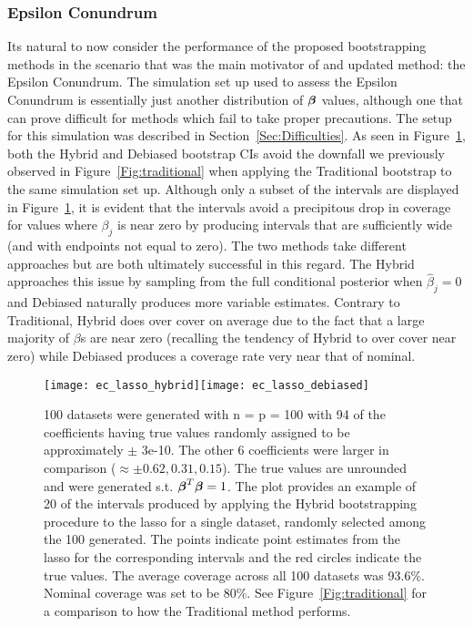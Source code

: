 \subsubsection{Epsilon Conundrum}\label{Sec:Epsilon}


Its natural to now consider the performance of the proposed bootstrapping methods in the scenario that was the main motivator of and updated method: the Epsilon Conundrum. The simulation set up used to assess the Epsilon Conundrum is essentially just another distribution of $\boldsymbol{\beta}$ values, although one that can prove difficult for methods which fail to take proper precautions. The setup for this simulation was described in Section~\ref{Sec:Difficulties}. As seen in Figure~\ref{Fig:zerosample2}, both the Hybrid and Debiased bootstrap CIs avoid the downfall we previously observed in Figure~\ref{Fig:traditional} when applying the Traditional bootstrap to the same simulation set up. Although only a subset of the intervals are displayed in Figure~\ref{Fig:zerosample2}, it is evident that the intervals avoid a precipitous drop in coverage for values where $\beta_j$ is near zero by producing intervals that are sufficiently wide (and with endpoints not equal to zero). The two methods take different approaches but are both ultimately successful in this regard. The Hybrid approaches this issue by sampling from the full conditional posterior when $\hat{\beta}_j = 0$ and Debiased naturally produces more variable estimates. Contrary to Traditional, Hybrid does over cover on average due to the fact that a large majority of $\beta$s are near zero (recalling the tendency of Hybrid to over cover near zero) while Debiased produces a coverage rate very near that of nominal. 


\begin{figure}[hbtp]
  \begin{center}
  \texttt{[image: ec\_lasso\_hybrid]}\texttt{[image: ec\_lasso\_debiased]}
  \caption{\label{Fig:zerosample2} 100 datasets were generated with n = p = 100 with 94 of the coefficients having true values randomly assigned to be approximately $\pm$ 3e-10. The other 6 coefficients were larger in comparison ($\approx \pm 0.62, 0.31, 0.15$). The true values are unrounded and were generated s.t. $\boldsymbol{\beta}^T\boldsymbol{\beta} = 1$. The plot provides an example of 20 of the intervals produced by applying the Hybrid bootstrapping procedure to the lasso for a single dataset, randomly selected among the 100 generated. The points indicate point estimates from the lasso for the corresponding intervals and the red circles indicate the true values. The average coverage across all 100 datasets was 93.6\%. Nominal coverage was set to be 80\%. See Figure~\ref{Fig:traditional} for a comparison to how the Traditional method performs.}
  \end{center}
\end{figure}


